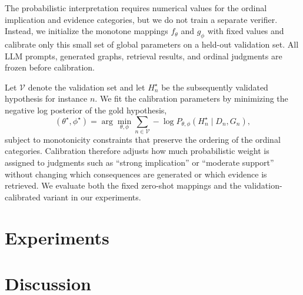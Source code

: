 \documentclass[twoside]{article}
\begin{document}
The probabilistic interpretation requires numerical values for the ordinal
implication and evidence categories, but we do not train a separate verifier.
Instead, we initialize the monotone mappings $f_{\theta}$ and $g_{\phi}$ with
fixed values and calibrate only this small set of global parameters on a held-out
validation set. All LLM prompts, generated graphs, retrieval results, and
ordinal judgments are frozen before calibration.

Let $\mathcal{V}$ denote the validation set and let $H_n^\star$ be the
subsequently validated hypothesis for instance $n$. We fit the calibration
parameters by minimizing the negative log posterior of the gold hypothesis,
\begin{equation}
    (\theta^\star,\phi^\star)
    =
    \arg\min_{\theta,\phi}
    \sum_{n\in\mathcal{V}}
    -\log
    P_{\theta,\phi}
    \left(
        H_n^\star
        \mid
        D_n,G_n
    \right),
    \label{eq:calibration-objective}
\end{equation}
subject to monotonicity constraints that preserve the ordering of the ordinal
categories. Calibration therefore adjusts how much probabilistic weight is
assigned to judgments such as ``strong implication'' or ``moderate support''
without changing which consequences are generated or which evidence is
retrieved. We evaluate both the fixed zero-shot mappings and the
validation-calibrated variant in our experiments.

\section{Experiments}

\section{Discussion}

\clearpage



\end{document}
